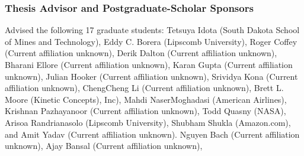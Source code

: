 \documentclass[11pt]{article}
\makeatletter
\newenvironment{citations}[2]
{\renewcommand\refname{#1}
\renewcommand\section[2]{\subsection*{#1}}
  \def\@citefile{#2}
 \begin{bibunit}[unsrt]}
{\putbib[\@citefile]
\end{bibunit}}
\makeatother
\begin{document}
\subsubsection*{Thesis Advisor and Postgraduate-Scholar Sponsors}

Advised the following 17 graduate students: Tetsuya Idota (South
Dakota School of Mines and Technology), 
Eddy
C. Borera (Lipscomb University), Roger Coffey (Current affiliation
unknown), Derik Dalton (Current affiliation unknown), Bharani Ellore
(Current affiliation unknown), Karan Gupta (Current affiliation
unknown), Julian Hooker (Current affiliation unknown), Srividya Kona
(Current affiliation unknown), ChengCheng Li (Current affiliation
unknown), Brett L. Moore (Kinetic Concepts), Inc), Mahdi
NaserMoghadasi (American Airlines), Krishnan Pazhayanoor (Current
affiliation unknown), Todd Quasny (NASA), Arisoa Randrianasolo
(Lipscomb University), Shubham Shukla (Amazon.com), and Amit Yadav
(Current affiliation unknown).
Nguyen Bach (Current
affiliation unknown), Ajay Bansal (Current affiliation unknown),








\end{document}
